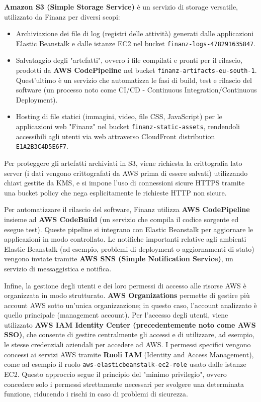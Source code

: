 \textbf{Amazon S3 (Simple Storage Service)} è un servizio di storage versatile, utilizzato da Finanz per diversi scopi:
\begin{itemize}
    \item Archiviazione dei file di log (registri delle attività) generati dalle applicazioni Elastic Beanstalk e dalle istanze EC2 nel bucket \texttt{finanz-logs-478291635847}.
    \item Salvataggio degli "artefatti", ovvero i file compilati e pronti per il rilascio, prodotti da \textbf{AWS CodePipeline} nel bucket \texttt{finanz-artifacts-eu-south-1}. Quest'ultimo è un servizio che automatizza le fasi di build, test e rilascio del software (un processo noto come CI/CD - Continuous Integration/Continuous Deployment).
    \item Hosting di file statici (immagini, video, file CSS, JavaScript) per le applicazioni web "Finanz" nel bucket \texttt{finanz-static-assets}, rendendoli accessibili agli utenti via web attraverso CloudFront distribution \texttt{E1A2B3C4D5E6F7}.
\end{itemize}
Per proteggere gli artefatti archiviati in S3, viene richiesta la crittografia lato server (i dati vengono crittografati da AWS prima di essere salvati) utilizzando chiavi gestite da KMS, e si impone l'uso di connessioni sicure HTTPS tramite una bucket policy che nega esplicitamente le richieste HTTP non sicure.

Per automatizzare il rilascio del software, Finanz utilizza \textbf{AWS CodePipeline} insieme ad \textbf{AWS CodeBuild} (un servizio che compila il codice sorgente ed esegue test). Queste pipeline si integrano con Elastic Beanstalk per aggiornare le applicazioni in modo controllato. Le notifiche importanti relative agli ambienti Elastic Beanstalk (ad esempio, problemi di deployment o aggiornamenti di stato) vengono inviate tramite \textbf{AWS SNS (Simple Notification Service)}, un servizio di messaggistica e notifica.

Infine, la gestione degli utenti e dei loro permessi di accesso alle risorse AWS è organizzata in modo strutturato. \textbf{AWS Organizations} permette di gestire più account AWS sotto un'unica organizzazione; in questo caso, l'account analizzato è quello principale (management account). Per l'accesso degli utenti, viene utilizzato \textbf{AWS IAM Identity Center (precedentemente noto come AWS SSO)}, che consente di gestire centralmente gli accessi e di utilizzare, ad esempio, le stesse credenziali aziendali per accedere ad AWS. I permessi specifici vengono concessi ai servizi AWS tramite \textbf{Ruoli IAM} (Identity and Access Management), come ad esempio il ruolo \texttt{aws-elasticbeanstalk-ec2-role} usato dalle istanze EC2. Questo approccio segue il principio del "minimo privilegio", ovvero concedere solo i permessi strettamente necessari per svolgere una determinata funzione, riducendo i rischi in caso di problemi di sicurezza.

